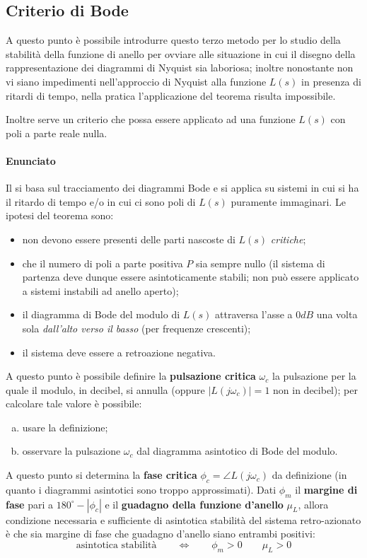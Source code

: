 	\subsection{Criterio di Bode}
		A questo punto è possibile introdurre questo terzo metodo per lo studio della stabilità della funzione di anello per ovviare alle situazione in cui il disegno della rappresentazione dei diagrammi di Nyquist sia laboriosa; inoltre nonostante non vi siano impedimenti nell'approccio di Nyquist alla funzione $L(s)$ in presenza di ritardi di tempo, nella pratica l'applicazione del teorema risulta impossibile.
	
		Inoltre serve un criterio che possa essere applicato ad una funzione $L(s)$ con poli a parte reale nulla.
		
		\paragraph{Enunciato} Il  si basa sul tracciamento dei diagrammi Bode e si applica su sistemi in cui si ha il ritardo di tempo e/o in cui ci sono poli di $L(s)$ puramente immaginari. Le ipotesi del teorema sono:
		\begin{itemize}
			\item non devono essere presenti delle parti nascoste di $L(s)$ \textit{critiche};
			\item che il numero di poli a parte positiva $P$ sia sempre nullo (il sistema di partenza deve dunque essere asintoticamente stabili; non può essere applicato a sistemi instabili ad anello aperto);
			\item il diagramma di Bode del modulo di $L(s)$ attraversa l'asse a $0dB$ una volta sola \textit{dall'alto verso il basso} (per frequenze crescenti);
			\item il sistema deve essere a retroazione negativa.
		\end{itemize}
		A questo punto è possibile definire la \textbf{pulsazione critica} $\omega_c$ la pulsazione per la quale il modulo, in decibel, si annulla (oppure $|L(j\omega_c)| = 1$ non in decibel); per calcolare tale valore è possibile:
		\begin{enumerate}[a)]
			\item usare la definizione; 
			\item osservare la pulsazione $\omega_c$ dal diagramma asintotico di Bode del modulo.
		\end{enumerate}
		A questo punto si determina la \textbf{fase critica} $\phi_c = \angle L(j\omega_c)$ da definizione (in quanto i diagrammi asintotici sono troppo approssimati). Dati $\phi_m$ il \textbf{margine di fase} pari a $180^\circ - |\phi_c|$ e il \textbf{guadagno della funzione d'anello} $\mu_L$, allora condizione necessaria e sufficiente di asintotica stabilità del sistema retro-azionato è che sia margine di fase che guadagno d'anello siano entrambi positivi:
		\[ \textrm{asintotica stabilità} \qquad \Leftrightarrow \qquad \phi_m > 0 \qquad \mu_L> 0\]
		
